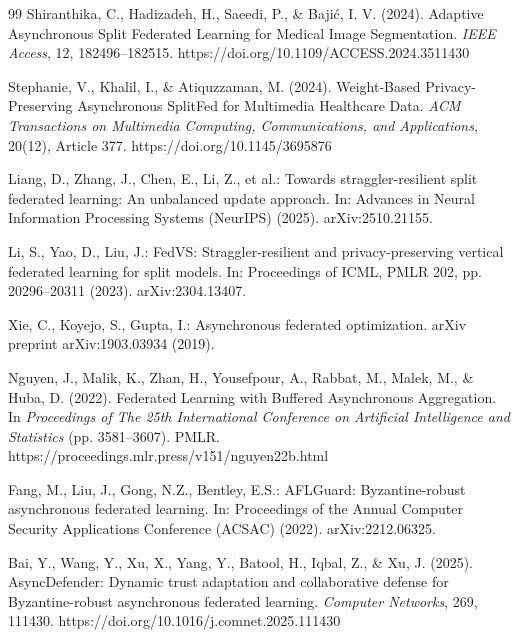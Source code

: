\documentclass[pdflatex,sn-mathphys-num]{sn-jnl}
\begin{document}
\begin{thebibliography}{99}
Shiranthika, C., Hadizadeh, H., Saeedi, P., \& Bajić, I. V. (2024). Adaptive Asynchronous Split Federated Learning for Medical Image Segmentation. \textit{IEEE Access}, 12, 182496--182515. https://doi.org/10.1109/ACCESS.2024.3511430

Stephanie, V., Khalil, I., \& Atiquzzaman, M. (2024). Weight-Based Privacy-Preserving Asynchronous SplitFed for Multimedia Healthcare Data. \textit{ACM Transactions on Multimedia Computing, Communications, and Applications}, 20(12), Article 377. https://doi.org/10.1145/3695876

Liang, D., Zhang, J., Chen, E., Li, Z., et al.: Towards straggler-resilient split federated learning: An unbalanced update approach. In: Advances in Neural Information Processing Systems (NeurIPS) (2025). arXiv:2510.21155.

Li, S., Yao, D., Liu, J.: FedVS: Straggler-resilient and privacy-preserving vertical federated learning for split models. In: Proceedings of ICML, PMLR 202, pp. 20296--20311 (2023). arXiv:2304.13407.

Xie, C., Koyejo, S., Gupta, I.: Asynchronous federated optimization. arXiv preprint arXiv:1903.03934 (2019).

Nguyen, J., Malik, K., Zhan, H., Yousefpour, A., Rabbat, M., Malek, M., \& Huba, D. (2022). Federated Learning with Buffered Asynchronous Aggregation. In \textit{Proceedings of The 25th International Conference on Artificial Intelligence and Statistics} (pp. 3581--3607). PMLR. https://proceedings.mlr.press/v151/nguyen22b.html

Fang, M., Liu, J., Gong, N.Z., Bentley, E.S.: AFLGuard: Byzantine-robust asynchronous federated learning. In: Proceedings of the Annual Computer Security Applications Conference (ACSAC) (2022). arXiv:2212.06325.

Bai, Y., Wang, Y., Xu, X., Yang, Y., Batool, H., Iqbal, Z., \& Xu, J. (2025). AsyncDefender: Dynamic trust adaptation and collaborative defense for Byzantine-robust asynchronous federated learning. \textit{Computer Networks}, 269, 111430. https://doi.org/10.1016/j.comnet.2025.111430


\end{thebibliography}
\end{document}
